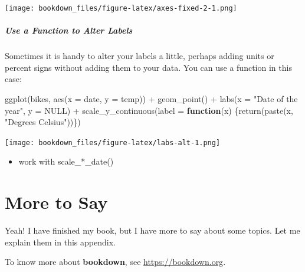 \documentclass[
]{krantz}
\makeatletter
\newenvironment{Shaded}{\begin{snugshade}}{\end{snugshade}}
\newcommand{\AttributeTok}[1]{\textcolor[rgb]{0.61,0.61,0.61}{#1}}
\newcommand{\ConstantTok}[1]{\textcolor[rgb]{0,0,0}{#1}}
\newcommand{\ControlFlowTok}[1]{\textcolor[rgb]{0.27,0.27,0.27}{\textbf{#1}}}
\newcommand{\FunctionTok}[1]{\textcolor[rgb]{0,0,0}{#1}}
\newcommand{\NormalTok}[1]{#1}
\newcommand{\SpecialCharTok}[1]{\textcolor[rgb]{0,0,0}{#1}}
\newcommand{\StringTok}[1]{\textcolor[rgb]{0.5,0.5,0.5}{#1}}
\providecommand{\tightlist}{%
  \setlength{\itemsep}{0pt}\setlength{\parskip}{0pt}}
\newenvironment{kframe}{%
\medskip{}
\setlength{\fboxsep}{.8em}
 \def\at@end@of@kframe{}%
 \ifinner\ifhmode%
  \def\at@end@of@kframe{\end{minipage}}%
  \begin{minipage}{\columnwidth}%
 \fi\fi%
 \def\FrameCommand##1{\hskip\@totalleftmargin \hskip-\fboxsep
 \colorbox{shadecolor}{##1}\hskip-\fboxsep
     \hskip-\linewidth \hskip-\@totalleftmargin \hskip\columnwidth}%
 \MakeFramed {\advance\hsize-\width
   \@totalleftmargin\z@ \linewidth\hsize
   \@setminipage}}%
 {\par\unskip\endMakeFramed%
 \at@end@of@kframe}
\renewenvironment{Shaded}{\begin{kframe}}{\end{kframe}}
\makeatother
\begin{document}
\texttt{[image: bookdown\_files/figure-latex/axes-fixed-2-1.png]}

\hypertarget{use-a-function-to-alter-labels}{%
\paragraph{Use a Function to Alter Labels}\label{use-a-function-to-alter-labels}}

Sometimes it is handy to alter your labels a little, perhaps adding units or percent signs without adding them to your data. You can use a function in this case:

\begin{Shaded}
\begin{Highlighting}[]
\FunctionTok{ggplot}\NormalTok{(bikes, }\FunctionTok{aes}\NormalTok{(}\AttributeTok{x =}\NormalTok{ date, }\AttributeTok{y =}\NormalTok{ temp)) }\SpecialCharTok{+}
  \FunctionTok{geom\_point}\NormalTok{() }\SpecialCharTok{+}
  \FunctionTok{labs}\NormalTok{(}\AttributeTok{x =} \StringTok{"Date of the year"}\NormalTok{, }\AttributeTok{y =} \ConstantTok{NULL}\NormalTok{) }\SpecialCharTok{+}
  \FunctionTok{scale\_y\_continuous}\NormalTok{(}\AttributeTok{label =} \ControlFlowTok{function}\NormalTok{(x) \{}\FunctionTok{return}\NormalTok{(}\FunctionTok{paste}\NormalTok{(x, }\StringTok{"Degrees Celsius"}\NormalTok{))\})}
\end{Highlighting}
\end{Shaded}

\texttt{[image: bookdown\_files/figure-latex/labs-alt-1.png]}

\begin{itemize}
\tightlist
\item
  work with scale\_*\_date()
\end{itemize}

\cleardoublepage

\hypertarget{appendix-appendix}{%
\appendix {}}


\hypertarget{more-to-say}{%
\chapter{More to Say}\label{more-to-say}}

Yeah! I have finished my book, but I have more to say about some topics. Let me explain them in this appendix.

To know more about \textbf{bookdown}, see \url{https://bookdown.org}.

  

\backmatter
\printindex
\end{document}
